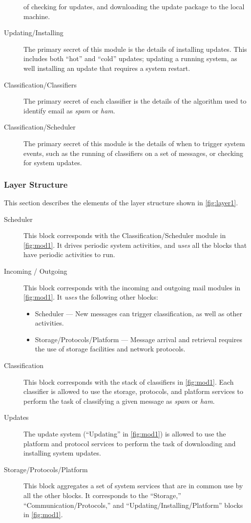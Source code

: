 \documentclass[letterpaper,11pt]{article}
\begin{document}
\begin{description}
  of checking for updates, and downloading the update package to the local
  machine.
\item[Updating/Installing] The primary secret of this module is the details of
  installing updates.  This includes both ``hot'' and ``cold'' updates;
  updating a running system, as well installing an update that requires a
  system restart.
\item[Classification/Classifiers] The primary secret of each classifier is the
  details of the algorithm used to identify email as \textit{spam} or
  \textit{ham}.
\item[Classification/Scheduler] The primary secret of this module is the
  details of when to trigger system events, such as the running of classifiers
  on a set of messages, or checking for system updates.
\end{description}

\subsubsection{Layer Structure}
This section describes the elements of the layer structure shown in
\autoref{fig:layer1}.
\begin{description}
\item[Scheduler] This block corresponds with the Classification/Scheduler
  module in \autoref{fig:mod1}.  It drives periodic system activities, and
  \textit{uses} all the blocks that have periodic activities to run.
\item[Incoming / Outgoing] This block corresponds with the incoming and
  outgoing mail modules in \autoref{fig:mod1}.  It \textit{uses} the following
  other blocks:
  \begin{itemize}
  \item Scheduler --- New messages can trigger classification, as well as
    other activities.
  \item Storage/Protocols/Platform --- Message arrival and retrieval requires
    the use of storage facilities and network protocols.
  \end{itemize}
\item[Classification] This block corresponds with the stack of classifiers in
  \autoref{fig:mod1}.  Each classifier is allowed to use the storage,
  protocols, and platform services to perform the task of classifying a given
  message as \textit{spam} or \textit{ham}.
\item[Updates] The update system (``Updating'' in \autoref{fig:mod1}) is
  allowed to use the platform and protocol services to perform the task of
  downloading and installing system updates.
\item[Storage/Protocols/Platform] This block aggregates a set of system
  services that are in common use by all the other blocks.  It corresponds to
  the ``Storage,'' ``Communication/Protocols,'' and
  ``Updating/Installing/Platform'' blocks in \autoref{fig:mod1}.
\end{description}
\end{document}
